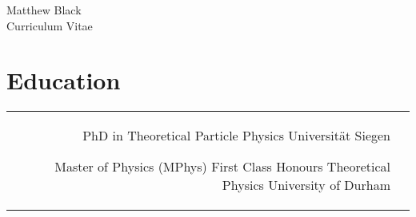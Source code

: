 \documentclass[10pt]{article} %
\begin{document}
\begin{paracol}{2} %


\parbox[top][0.12\textheight][c]{\linewidth}{ %
	\vspace{-0.04\textheight} %
	\centering %
	{\sffamily\Huge Matthew Black}\\\medskip %
	{\Huge\color{headings}\cvtextfont Curriculum Vitae}
}

\section{Education}





\begin{supertabular}{rp{6.7cm}} %


	{PhD in Theoretical Particle Physics} %
    {} %
	{} %
	{Universit\"at Siegen} %


	{Master of Physics (MPhys)} %
    {First Class Honours}
	{Theoretical Physics} %
	{University of Durham} %


\end{supertabular}
\end{paracol}
\end{document}
